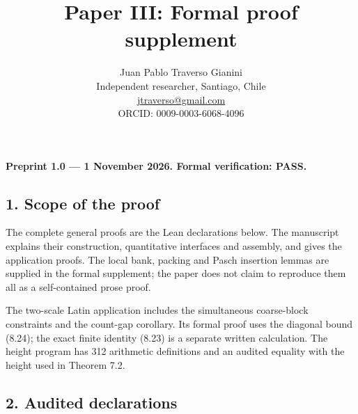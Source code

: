 \documentclass[english,11pt,a4paper]{article}
\title{Paper III: Formal proof supplement}
\author{Juan Pablo Traverso Gianini\\
\small Independent researcher, Santiago, Chile\\
\small \href{mailto:jtraverso@gmail.com}{jtraverso@gmail.com}\\
\small ORCID: 0009-0003-6068-4096}
\date{}
\begin{document}
\raggedbottom\maketitle
\small\setlength{\parskip}{3pt}
\textbf{Preprint 1.0 --- 1 November 2026. Formal verification: PASS.}

\subsection{1. Scope of the proof}\label{scope-of-the-proof}

The complete general proofs are the Lean declarations below. The manuscript explains their construction, quantitative interfaces and assembly, and gives the application proofs. The local bank, packing and Pasch insertion lemmas are supplied in the formal supplement; the paper does not claim to reproduce them all as a self-contained prose proof.

The two-scale Latin application includes the simultaneous coarse-block constraints and the count-gap corollary. Its formal proof uses the diagonal bound (8.24); the exact finite identity (8.23) is a separate written calculation. The height program has 312 arithmetic definitions and an audited equality with the height used in Theorem 7.2.

\subsection{2. Audited declarations}\label{audited-declarations}
\end{document}
